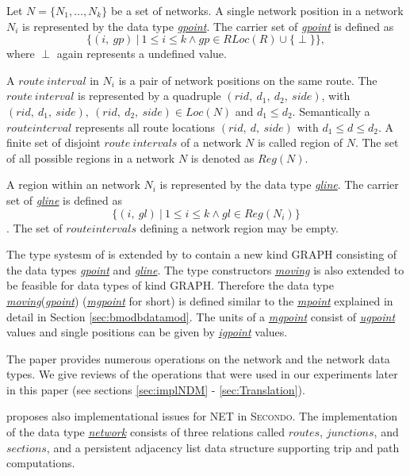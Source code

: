 \documentclass[a4paper]{article}
\newcommand{\secondo}{\textsc{Secondo}}
\newcommand{\dt}[1]{\textsl{\underline{#1}}}
\begin{document}
Let $N=\{N_1,\ldots,N_k\}$ be a set of networks. A single network position in a
network $N_i$ is represented by the data type \dt{gpoint}. The carrier set of
\dt{gpoint} is defined as
\[\{(i,\ gp)\ |\ 1 \leq i \leq k \wedge gp \in RLoc(R) \cup \{ \perp \}\},\]
where $\perp$ again represents a undefined value.

A $route\ interval$ in $N_i$ is a pair of network positions on the same route. The $route\ interval$ is represented by a quadruple $(rid,\ d_1,\ d_2,\ side)$, with
$(rid,\ d_1,\ side),\ (rid,\ d_2,\ side) \in Loc(N)$
and $d_1 \leq d_2$. Semantically
a $route interval$ represents all route locations $(rid,\ d,\ side)$ with
$d_1 \leq d \leq d_2$. A finite set of disjoint $route\ intervals$ of a network
$N$ is called region of $N$. The set of all possible regions in a network $N$ is
denoted as $Reg(N)$.

A region within an network $N_i$ is represented by the data type \dt{gline}.
The carrier set of \dt{gline} is defined as
\[\{(i,\ gl)\ |\ 1 \leq i \leq k \wedge gl \in Reg(N_i) \}\].
The set of $route intervals$ defining a network region may be empty.

The type systesm of \cite{RepresentingMovingObjectsGueting} is extended by
\cite{NetworkGueting} to contain a new kind GRAPH consisting of the data types
\dt{gpoint} and \dt{gline}. The type constructors \dt{moving} is also extended
to be feasible for data types of kind GRAPH. Therefore the data type
\dt{moving}(\dt{gpoint}) (\dt{mgpoint} for short) is defined similar to the
\dt{mpoint} explained in detail in Section \ref{sec:bmodbdatamod}. The units of
a \dt{mgpoint} consist of \dt{ugpoint} values and single positions can be given
by \dt{igpoint} values.

The paper provides numerous operations on the network and the network data types.
We give reviews of the operations that were used in our experiments later in this
paper (see sections \ref{sec:implNDM} - \ref{sec:Translation}).

\cite{NetworkGueting} proposes also implementational issues for NET in
\secondo{}. The implementation of the data type \dt{network} consists of three
relations called $routes$, $junctions$, and $sections$, and a persistent adjacency
list data structure supporting trip and path computations.
\end{document}
